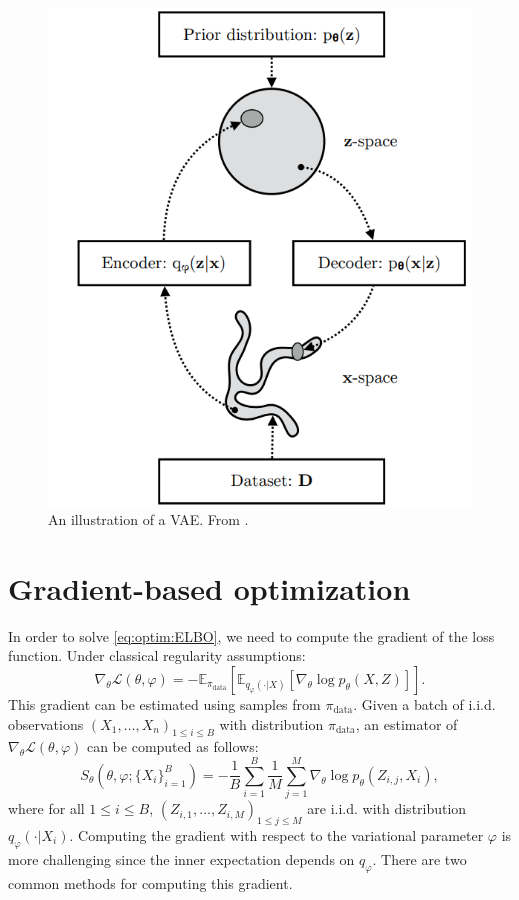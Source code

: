 \documentclass[english,graybox,envcountchap,envcountsame,sectrefs,shortlabels]{svmono}
\theoremstyle{style}
\newcommand{\eqsp}{}
\begin{document}
\begin{figure}
\centering
\includegraphics[scale=0.8]{vae.png}
\caption{An illustration of a VAE. From \cite{kingma2019introduction}.}
\label{fig:vae}
\end{figure}

\section{Gradient-based optimization}
In order to solve \eqref{eq:optim:ELBO}, we need to compute the gradient of the loss function. Under classical regularity assumptions:
$$
\nabla_{\theta} \mathcal{L}(\theta, \varphi) = -\mathbb{E}_{\pi_{\mathrm{data}}} \left[\mathbb{E}_{q_{\varphi}(\cdot|X)}\left[ \nabla_{\theta} \log p_{\theta}(X, Z)\right]\right]\eqsp.
$$
This gradient can be estimated using samples from $\pi_{\mathrm{data}}$. Given a batch of i.i.d. observations $(X_1,\ldots,X_n)_{1\leqslant i \leqslant B}$ with distribution $\pi_{\mathrm{data}}$, an estimator of $\nabla_{\theta} \mathcal{L}(\theta, \varphi)$  can be computed as follows:
$$
S_{\theta}(\theta, \varphi;\{X_i\}_{i=1}^B) = -\frac{1}{B}\sum_{i=1}^B\frac{1}{M}\sum_{j=1}^M \nabla_\theta \log p_\theta(Z_{i,j},X_i)\eqsp,
$$
where for all $1\leqslant i \leqslant B$, $(Z_{i,1},\ldots, Z_{i,M})_{1\leqslant j\leqslant M}$ are i.i.d. with distribution $q_{\varphi}(\cdot|X_i)$.
Computing the gradient with respect to the variational parameter $\varphi$ is more challenging since the inner expectation depends on  $q_{\varphi}$. There are two common methods for computing this gradient. 
\end{document}
